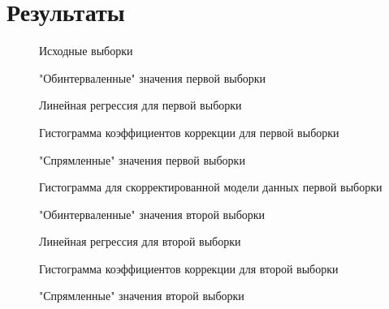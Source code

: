 \section{Результаты}
\begin{figure}[H]
	\caption{Исходные выборки}
	\label{fig:input_data}
\end{figure}
\begin{figure}[H]
	\caption{"Обинтерваленные"  значения первой выборки}
	\label{fig:data1_interval}
\end{figure}
\begin{figure}[H]
	\caption{Линейная регрессия для первой выборки}
	\label{fig:data1_fixed}
\end{figure}
\begin{figure}[H]
	\caption{Гистограмма коэффициентов коррекции для первой выборки}
	\label{fig:w1_hist}
\end{figure}
\begin{figure}[H]
	\caption{"Спрямленные"  значения первой выборки}
	\label{fig:data1_const}
\end{figure}
\begin{figure}[H]
	\caption{Гистограмма для скорректированной модели данных первой выборки}
	\label{fig:data1_hist_const}
\end{figure}
\begin{figure}[H]
	\caption{"Обинтерваленные"  значения второй выборки}
	\label{fig:data2_interval}
\end{figure}
\begin{figure}[H]
	\caption{Линейная регрессия для второй выборки}
	\label{fig:data2_fixed}
\end{figure}
\begin{figure}[H]
	\caption{Гистограмма коэффициентов коррекции для второй выборки}
	\label{fig:w2_hist}
\end{figure}
\begin{figure}[H]
	\caption{"Спрямленные"  значения второй выборки}
	\label{fig:data2_const}
\end{figure}
